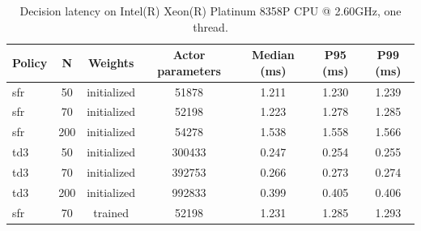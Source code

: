 \begin{table}[t]
\centering
\caption{Decision latency on Intel(R) Xeon(R) Platinum 8358P CPU @ 2.60GHz, one thread.}
\label{tab:rev_latency}
\footnotesize
\setlength{\tabcolsep}{3pt}
\begin{tabular}{lcccccc}
\hline
Policy & N & Weights & Actor parameters & Median (ms) & P95 (ms) & P99 (ms) \\
\hline
sfr & 50 & initialized & 51878 & 1.211 & 1.230 & 1.239 \\
sfr & 70 & initialized & 52198 & 1.223 & 1.278 & 1.285 \\
sfr & 200 & initialized & 54278 & 1.538 & 1.558 & 1.566 \\
td3 & 50 & initialized & 300433 & 0.247 & 0.254 & 0.255 \\
td3 & 70 & initialized & 392753 & 0.266 & 0.273 & 0.274 \\
td3 & 200 & initialized & 992833 & 0.399 & 0.405 & 0.406 \\
sfr & 70 & trained & 52198 & 1.231 & 1.285 & 1.293 \\
\hline
\end{tabular}
\end{table}

